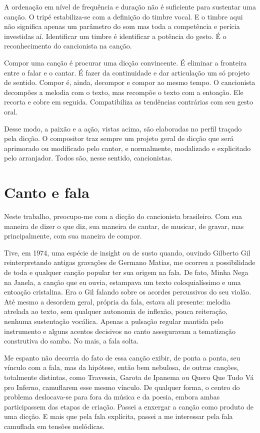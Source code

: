 A ordenação em nível de frequência e duração não é suficiente para
sustentar uma canção. O tripé estabiliza-se com a definição do timbre
vocal. E o timbre aqui não significa apenas um parâmetro do som mas toda
a competência e perícia investidas aí. Identificar um timbre é
identificar a potência do gesto. É o reconhecimento do cancionista na
canção.

Compor uma canção é procurar uma dicção convincente. É eliminar a
fronteira entre o falar e o cantar. É fazer da continuidade e dar
articulação um só projeto de sentido. Compor é, ainda, decompor e compor
ao mesmo tempo. O cancionista decompões a melodia com o texto, mas
recompõe o texto com a entoação. Ele recorta e cobre em seguida.
Compatibiliza as tendências contrárias com seu gesto oral.~

Desse modo, a paixão e a ação, vistas acima, são elaboradas no perfil
traçado pela dicção. O compositor traz sempre um projeto geral de dicção
que será aprimorado ou modificado pelo cantor, e normalmente, modalizado
e explicitado pelo arranjador. Todos são, nesse sentido, cancionistas.

\section{Canto e fala}

Neste trabalho, preocupo-me com a dicção do cancionista brasileiro. Com
sua maneira de dizer o que diz, sua maneira de cantar, de musicar, de
gravar, mas principalmente, com sua maneira de compor.

Tive, em 1974, uma espécie de insight ou de susto quando, ouvindo
Gilberto Gil reinterpretando antigas gravações de Germano Matias, me
ocorreu a possibilidade de toda e qualquer canção popular ter sua origem
na fala. De fato, Minha Nega na Janela, a canção que eu ouvia, estampava
um texto coloquialíssimo e uma entoação cristalina. Era o Gil falando
sobre os acordes percussivos do seu violão. Até mesmo a desordem geral,
própria da fala, estava ali presente: melodia atrelada ao texto, sem
qualquer autonomia de inflexão, pouca reiteração, nenhuma sustentação
vocálica. Apenas a pulsação regular mantida pelo instrumento e alguns
acentos decisivos no canto asseguravam a tematização construtiva do
samba. No mais, a fala solta.

Me espanto não decorria do fato de essa canção exibir, de ponta a ponta,
seu vínculo com a fala, mas da hipótese, então bem nebulosa, de outras
canções, totalmente distintas, como Travessia, Garota de Ipanema ou
Quero Que Tudo Vá pro Inferno, camuflarem esse mesmo vínculo. De
qualquer forma, o centro do problema deslocava-se para fora da música e
da poesia, embora ambas participassem das etapas de criação. Passei a
enxergar a canção como produto de uma dicção. E mais que pela fala
explícita, passei a me interessar pela fala camuflada em tensões
melódicas.

